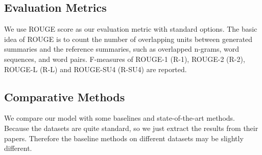\documentclass[11pt,letterpaper]{article}
\begin{document}
\subsection{Evaluation Metrics}
We use ROUGE score \cite{lin2004rouge} as our evaluation metric with standard options.
The basic idea of ROUGE is to count the number of overlapping units between generated summaries and the reference summaries, such as overlapped n-grams, word sequences, and word pairs.
F-measures of ROUGE-1 (R-1), ROUGE-2 (R-2), ROUGE-L (R-L) and ROUGE-SU4 (R-SU4) are reported.



\subsection{Comparative Methods}
We compare our model with some baselines and state-of-the-art methods.
Because the datasets are quite standard, so we just extract the results from their papers. Therefore the baseline methods on different datasets may be slightly different.
\end{document}
